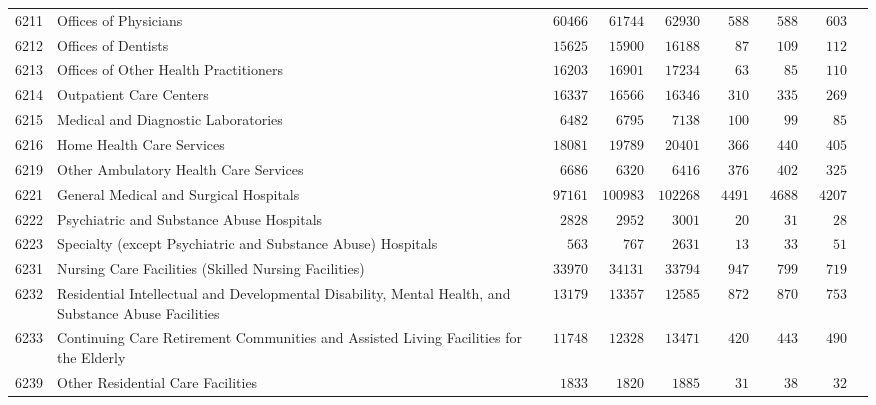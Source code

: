 \documentclass[9pt, oneside]{article}   	%
\begin{document}
\begin{longtable}{lp{3 in}ccccccc}
6211  & Offices of Physicians & $\phantom{0}60466$ & $\phantom{0}61744$ & $\phantom{0}62930$ & $\phantom{00}588$ & $\phantom{00}588$ & $\phantom{00}603$ \\
6212  & Offices of Dentists & $\phantom{0}15625$ & $\phantom{0}15900$ & $\phantom{0}16188$ & $\phantom{000}87$ & $\phantom{00}109$ & $\phantom{00}112$ \\
6213  & Offices of Other Health Practitioners & $\phantom{0}16203$ & $\phantom{0}16901$ & $\phantom{0}17234$ & $\phantom{000}63$ & $\phantom{000}85$ & $\phantom{00}110$ \\
6214  & Outpatient Care Centers & $\phantom{0}16337$ & $\phantom{0}16566$ & $\phantom{0}16346$ & $\phantom{00}310$ & $\phantom{00}335$ & $\phantom{00}269$ \\
6215  & Medical and Diagnostic Laboratories & $\phantom{00}6482$ & $\phantom{00}6795$ & $\phantom{00}7138$ & $\phantom{00}100$ & $\phantom{000}99$ & $\phantom{000}85$ \\
6216  & Home Health Care Services & $\phantom{0}18081$ & $\phantom{0}19789$ & $\phantom{0}20401$ & $\phantom{00}366$ & $\phantom{00}440$ & $\phantom{00}405$ \\
6219  & Other Ambulatory Health Care Services & $\phantom{00}6686$ & $\phantom{00}6320$ & $\phantom{00}6416$ & $\phantom{00}376$ & $\phantom{00}402$ & $\phantom{00}325$ \\

6221  & General Medical and Surgical Hospitals & $\phantom{0}97161$ & $100983$ & $102268$ & $\phantom{0}4491$ & $\phantom{0}4688$ & $\phantom{0}4207$ \\
6222  & Psychiatric and Substance Abuse Hospitals & $\phantom{00}2828$ & $\phantom{00}2952$ & $\phantom{00}3001$ & $\phantom{000}20$ & $\phantom{000}31$ & $\phantom{000}28$ \\
6223  & Specialty (except Psychiatric and Substance Abuse) Hospitals & $\phantom{000}563$ & $\phantom{000}767$ & $\phantom{00}2631$ & $\phantom{000}13$ & $\phantom{000}33$ & $\phantom{000}51$ \\

6231  & Nursing Care Facilities (Skilled Nursing Facilities) & $\phantom{0}33970$ & $\phantom{0}34131$ & $\phantom{0}33794$ & $\phantom{00}947$ & $\phantom{00}799$ & $\phantom{00}719$ \\
6232  & Residential Intellectual and Developmental Disability, Mental Health, and Substance Abuse Facilities & $\phantom{0}13179$ & $\phantom{0}13357$ & $\phantom{0}12585$ & $\phantom{00}872$ & $\phantom{00}870$ & $\phantom{00}753$ \\
6233  & Continuing Care Retirement Communities and Assisted Living Facilities for the Elderly & $\phantom{0}11748$ & $\phantom{0}12328$ & $\phantom{0}13471$ & $\phantom{00}420$ & $\phantom{00}443$ & $\phantom{00}490$ \\
6239  & Other Residential Care Facilities & $\phantom{00}1833$ & $\phantom{00}1820$ & $\phantom{00}1885$ & $\phantom{000}31$ & $\phantom{000}38$ & $\phantom{000}32$ \\


\end{longtable}
\end{document}
